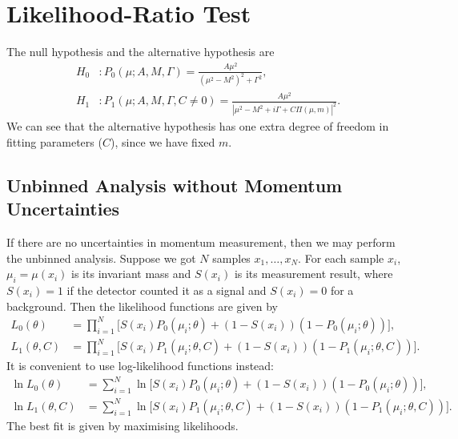 \documentclass[10pt]{article}
\theoremstyle{definition}
\theoremstyle{remark}
\begin{document}
	\section{Likelihood-Ratio Test}
	The null hypothesis and the alternative hypothesis are
	\begin{align*}
		H_{0}&:P_{0}(\mu;A,M,\Gamma)=\frac{A\mu^{2}}{(\mu^{2}-M^{2})^{2}+\Gamma^{2}},\\
		H_{1}&:P_{1}(\mu;A,M,\Gamma,C\neq0)=\frac{A\mu^{2}}{|\mu^{2}-M^{2}+i\Gamma+C\Pi(\mu,m)|^{2}}.
	\end{align*}
	We can see that the alternative hypothesis has one extra degree of freedom in fitting parameters ($C$), since we have fixed $m$.
	
	\subsection{Unbinned Analysis without Momentum Uncertainties}
	If there are no uncertainties in momentum measurement, then we may perform the unbinned analysis.
	Suppose we got $N$ samples $x_{1},\dots,x_{N}$.
	For each sample $x_{i}$, $\mu_{i}=\mu(x_{i})$ is its invariant mass and $S(x_{i})$ is its measurement result, where $S(x_{i})=1$ if the detector counted it as a signal and $S(x_{i})=0$ for a background.
	Then the likelihood functions are given by
	\begin{align*}
		L_{0}(\theta)&=\prod_{i=1}^{N}\Big[S(x_{i})P_{0}(\mu_{i};\theta)+(1-S(x_{i}))(1-P_{0}(\mu_{i};\theta))\Big],\\
		L_{1}(\theta,C)&=\prod_{i=1}^{N}\Big[S(x_{i})P_{1}(\mu_{i};\theta,C)+(1-S(x_{i}))(1-P_{1}(\mu_{i};\theta,C))\Big].
	\end{align*}
	It is convenient to use log-likelihood functions instead:
	\begin{align*}
		\ln L_{0}(\theta)&=\sum_{i=1}^{N}\ln\Big[S(x_{i})P_{0}(\mu_{i};\theta)+(1-S(x_{i}))(1-P_{0}(\mu_{i};\theta))\Big],\\
		\ln L_{1}(\theta,C)&=\sum_{i=1}^{N}\ln\Big[S(x_{i})P_{1}(\mu_{i};\theta,C)+(1-S(x_{i}))(1-P_{1}(\mu_{i};\theta,C))\Big].
	\end{align*}
	The best fit is given by maximising likelihoods.
	
\end{document}
